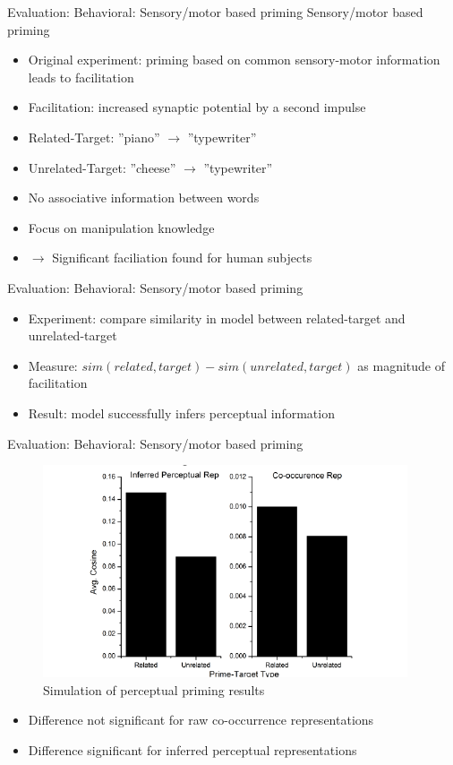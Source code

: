 \documentclass[12pt,a4paper]{beamer}
\begin{document}
\begin{frame}{Evaluation: Behavioral: Sensory/motor based priming}
Sensory/motor based priming
\begin{itemize}
\item Original experiment: priming based on common sensory-motor information leads to facilitation
\item Facilitation: increased synaptic potential by a second impulse
\item Related-Target: ''piano'' $\to$ ''typewriter''
\item Unrelated-Target: ''cheese'' $\to$ ''typewriter''
\item No associative information between words
\item Focus on manipulation knowledge
\item $\to$ Significant faciliation found for human subjects
\end{itemize}
\end{frame}

\begin{frame}{Evaluation: Behavioral: Sensory/motor based priming}
\begin{itemize}
\item Experiment: compare similarity in model between related-target and unrelated-target
\item Measure: $sim(related,target) - sim(unrelated,target)$ as magnitude of facilitation
\item Result: model successfully infers perceptual information
\end{itemize}
\end{frame}

\begin{frame}{Evaluation: Behavioral: Sensory/motor based priming}
\begin{figure}
\includegraphics[scale=0.7]{figure_4_perceptual_priming_results.png}
\caption{Simulation of perceptual priming results}
\end{figure}
\begin{itemize}
\item Difference not significant for raw co-occurrence representations
\item Difference significant for inferred perceptual representations
\end{itemize}

\end{frame}
\end{document}
